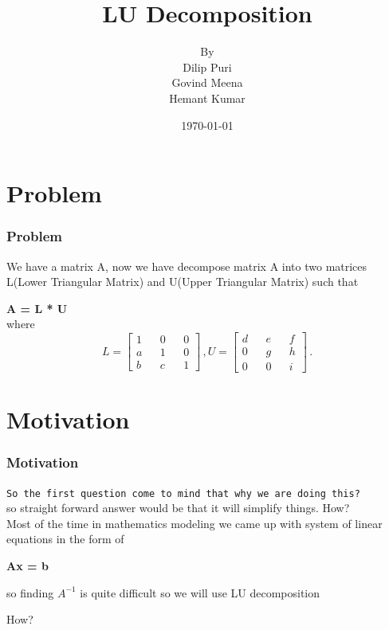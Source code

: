 \documentclass{beamer}
\begin{document}
\title{LU Decomposition}  
\author{By\\ Dilip Puri\\Govind Meena\\Hemant Kumar}
\date{\today} 
\begin{frame}
\titlepage
\end{frame}


\section{Problem} 
\begin{frame}\frametitle{Problem} 
We have a matrix A, now we have decompose matrix A into two matrices L(Lower Triangular Matrix) and U(Upper Triangular Matrix) such that \\
\begin{center}
\begin{LARGE}
\textbf{A = L * U}\\
where
\begin{equation*}
L = \left[ \begin{aligned}
1 && 0 && 0 \\
a && 1 && 0 \\
b && c && 1
\end{aligned}
\right]\,,
U = \left[ \begin{aligned}
d && e && f \\
0 && g && h \\
0 && 0 && i
\end{aligned}
\right]\,.
\end{equation*}
\end{LARGE}
\end{center}
\end{frame}


\section{Motivation} 
\begin{frame}\frametitle{Motivation} 
\texttt{So the first question come to mind that why we are doing this?}\\
so straight forward answer would be that it will simplify things. How?\\
Most of the time in mathematics modeling we came up with system of linear equations in the form of\\
\begin{center}
\begin{LARGE}
\textbf{Ax = b}
\end{LARGE}
\end{center}
so finding $A^{-1}$ is quite difficult so we will use LU decomposition\\
\begin{center} \begin{huge}
How?
\end{huge} \end{center}
\end{frame}
\end{document}
